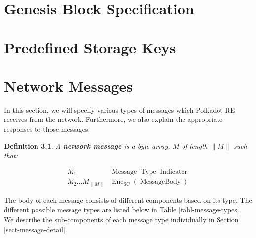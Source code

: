 \documentclass{book}
\newcommand{\tmop}[1]{\ensuremath{\operatorname{#1}}}
\newcommand{\tmstrong}[1]{\textbf{#1}}
\newcommand{\tmtextbf}[1]{{\bfseries{#1}}}
\newtheorem{definition}{Definition}
\providecommand{\tmop}[1]{\ensuremath{\mathrm{#1}}}
\providecommand{\tmstrong}[1]{\tmtextbf{#1}}
\providecommand{\tmtextbf}[1]{\tmtextbf{#1}}
\newtheorem{definition}{Definition}
\begin{document}
\chapter{Genesis Block Specification}\label{sect-genisis-block}

\chapter{Predefined Storage Keys}\label{sect-predef-storage-keys}

\chapter{Network Messages}\label{sect-network-messages}

In this section, we will specify various types of messages which Polkadot RE
receives from the network. Furthermore, we also explain the appropriate
responses to those messages.

\begin{definition}
  A {\tmstrong{network message}} is a byte array, {\tmstrong{$M$}} of length
  $\| M \|$ such that:
  
  
  \[ \begin{array}{cc}
       M_1 & \tmop{Message} \tmop{Type} \tmop{Indicator}\\
       M_2 \ldots M_{\| M \|} & \tmop{Enc}_{\tmop{SC}} (\tmop{MessageBody})
     \end{array} \]
  
\end{definition}

The body of each message consists of different components based on its type.
The different possible message types are listed below in Table
\ref{tabl-message-types}. We describe the sub-components of each message type
individually in Section \ref{sect-message-detail}.
\end{document}
